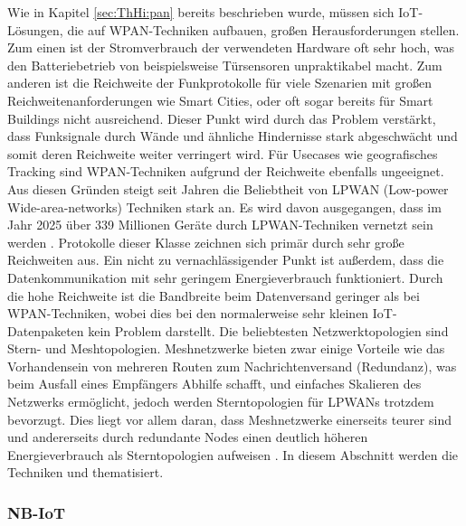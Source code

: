 Wie in Kapitel \ref{sec:ThHi:pan} bereits beschrieben wurde, müssen sich IoT-Lösungen, die auf WPAN-Techniken aufbauen, großen Herausforderungen stellen. Zum einen ist der Stromverbrauch der verwendeten Hardware oft sehr hoch, was den Batteriebetrieb von beispielsweise Türsensoren unpraktikabel macht. Zum anderen ist die Reichweite der Funkprotokolle für viele Szenarien mit großen Reichweitenanforderungen wie Smart Cities, oder oft sogar bereits für Smart Buildings nicht ausreichend. Dieser Punkt wird durch das Problem verstärkt, dass Funksignale durch Wände und ähnliche Hindernisse stark abgeschwächt und somit deren Reichweite weiter verringert wird. Für Usecases wie geografisches Tracking sind WPAN-Techniken aufgrund der Reichweite ebenfalls ungeeignet. Aus diesen Gründen steigt seit Jahren die Beliebtheit von LPWAN (Low-power Wide-area-networks) Techniken stark an. Es wird davon ausgegangen, dass im Jahr 2025 über 339 Millionen Geräte durch LPWAN-Techniken vernetzt sein werden . Protokolle dieser Klasse zeichnen sich primär durch sehr große Reichweiten aus. Ein nicht zu vernachlässigender Punkt ist außerdem, dass die Datenkommunikation mit sehr geringem Energieverbrauch funktioniert. Durch die hohe Reichweite ist die Bandbreite beim Datenversand geringer als bei WPAN-Techniken, wobei dies bei den normalerweise sehr kleinen IoT-Datenpaketen kein Problem darstellt. Die beliebtesten Netzwerktopologien sind Stern- und Meshtopologien. Meshnetzwerke bieten zwar einige Vorteile wie das Vorhandensein von mehreren Routen zum Nachrichtenversand (Redundanz), was beim Ausfall eines Empfängers Abhilfe schafft, und einfaches Skalieren des Netzwerks ermöglicht, jedoch werden Sterntopologien für LPWANs trotzdem bevorzugt. Dies liegt vor allem daran, dass Meshnetzwerke einerseits teurer sind und andererseits durch redundante Nodes einen deutlich höheren Energieverbrauch als Sterntopologien aufweisen . In diesem Abschnitt werden die Techniken  und  thematisiert. 

\subsubsection{NB-IoT}
\label{sec:ThHi:nbiot}

